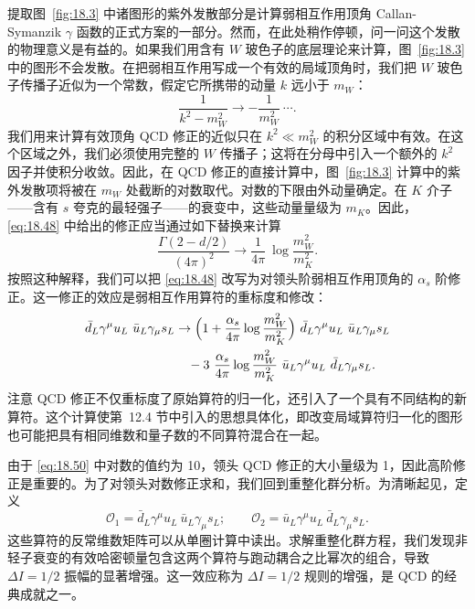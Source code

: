 提取图~\ref{fig:18.3} 中诸图形的紫外发散部分是计算弱相互作用顶角 Callan-Symanzik $\gamma$ 函数的正式方案的一部分。然而，在此处稍作停顿，问一问这个发散的物理意义是有益的。如果我们用含有 $W$ 玻色子的底层理论来计算，图~\ref{fig:18.3} 中的图形不会发散。在把弱相互作用写成一个有效的局域顶角时，我们把 $W$ 玻色子传播子近似为一个常数，假定它所携带的动量 $k$ 远小于 $m_W$：
\begin{equation}
  \frac{1}{k^2-m_W^2} \to -\frac{1}{m_W^2}\ \cdots .
  \label{eq:18.49}
\end{equation}
我们用来计算有效顶角 QCD 修正的近似只在 $k^2 \ll m_W^2$ 的积分区域中有效。在这个区域之外，我们必须使用完整的 $W$ 传播子；这将在分母中引入一个额外的 $k^2$ 因子并使积分收敛。因此，在 QCD 修正的直接计算中，图~\ref{fig:18.3} 计算中的紫外发散项将被在 $m_W$ 处截断的对数取代。对数的下限由外动量确定。在 $K$ 介子——含有 $s$ 夸克的最轻强子——的衰变中，这些动量量级为 $m_K$。因此，\eqref{eq:18.48} 中给出的修正应当通过如下替换来计算
\begin{equation}
  \frac{\Gamma(2-d/2)}{(4\pi)^2} \to \frac{1}{4\pi}\ \log\frac{m_W^2}{m_K^2}
  .
  \label{eq:18.50}
\end{equation}
按照这种解释，我们可以把 \eqref{eq:18.48} 改写为对领头阶弱相互作用顶角的 $\alpha_s$ 阶修正。这一修正的效应是弱相互作用算符的重标度和修改：
\begin{equation}
  \begin{aligned}
    \bar{d}_L\gamma^\mu u_L\ \bar{u}_L\gamma_\mu s_L
    &\to \Bigl( 1 + \frac{\alpha_s}{4\pi}\log\frac{m_W^2}{m_K^2} \Bigr)\
      \bar{d}_L\gamma^\mu u_L\ \bar{u}_L\gamma_\mu s_L\\
    &\quad - 3\ \frac{\alpha_s}{4\pi}\log\frac{m_W^2}{m_K^2}\
      \bar{u}_L\gamma^\mu u_L\ \bar{d}_L\gamma_\mu s_L .
  \end{aligned}
  \label{eq:18.51}
\end{equation}
注意 QCD 修正不仅重标度了原始算符的归一化，还引入了一个具有不同结构的新算符。这个计算使第~12.4 节中引入的思想具体化，即改变局域算符归一化的图形也可能把具有相同维数和量子数的不同算符混合在一起。

由于 \eqref{eq:18.50} 中对数的值约为 10，领头 QCD 修正的大小量级为 1，因此高阶修正是重要的。为了对领头对数修正求和，我们回到重整化群分析。为清晰起见，定义
\begin{equation}
  \mathcal{O}_1 = \bar{d}_L\gamma^\mu u_L\ \bar{u}_L\gamma_\mu s_L;
  \qquad \mathcal{O}_2 = \bar{u}_L\gamma^\mu u_L\ \bar{d}_L\gamma_\mu s_L .
  \label{eq:18.52}
\end{equation}
这些算符的反常维数矩阵可以从单圈计算中读出。求解重整化群方程，我们发现非轻子衰变的有效哈密顿量包含这两个算符与跑动耦合之比幂次的组合，导致 $\Delta I = 1/2$ 振幅的显著增强。这一效应称为 $\Delta I = 1/2$ 规则的增强，是 QCD 的经典成就之一。


